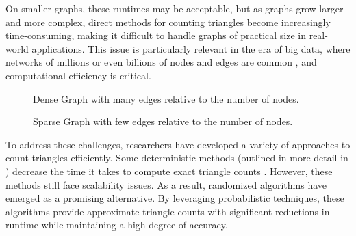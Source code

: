 \documentclass[11pt, margin=1in]{article}
\begin{document}
On smaller graphs, these runtimes may be acceptable, but as graphs grow larger and more complex, direct methods for counting triangles become increasingly time-consuming, making it difficult to handle graphs of practical size in real-world applications.
This issue is particularly relevant in the era of big data, where networks of millions or even billions of nodes and edges are common \cite{sandryhaila_big_2014}, and computational efficiency is critical.

\begin{figure}[H]
    \centering
    \begin{minipage}{0.45\textwidth}
        \centering
        \caption{Dense Graph with many edges relative to the number of nodes.}
        \label{fig:dense_graph}
    \end{minipage}%
    \hspace{0.5cm}
    \begin{minipage}{0.45\textwidth}
        \centering
        \caption{Sparse Graph with few edges relative to the number of nodes.}
        \label{fig:sparse_graph}
    \end{minipage}
\end{figure}

To address these challenges, researchers have developed a variety of approaches to count triangles efficiently.
Some deterministic methods (outlined in more detail in ) decrease the time it takes to compute exact triangle counts \cite{strassen_gaussian_1969}.
However, these methods still face scalability issues.
As a result, randomized algorithms \cite{motwani_randomized_1995,tsourakakis_doulion_2009,seshadhri_triadic_2013,tsourakakis_fast_2008,avron_counting_2010} have emerged as a promising alternative.
By leveraging probabilistic techniques, these algorithms provide approximate triangle counts with significant reductions in runtime while maintaining a high degree of accuracy.
\end{document}
